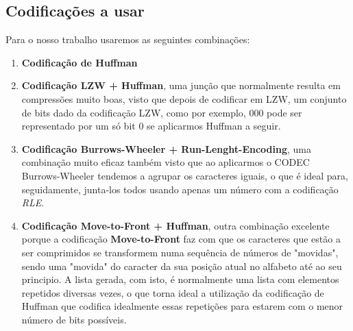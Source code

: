 \documentclass[11pt,journal,compsoc]{IEEEtran}
\begin{document}
\subsection{Codificações a usar}
Para o nosso trabalho usaremos as seguintes combinações:
\begin{enumerate}
    \item \textbf{Codificação de Huffman}
    \item \textbf{Codificação LZW + Huffman}, uma junção que normalmente resulta em compressões muito boas, visto que depois de codificar em LZW, um conjunto de bits dado da codificação LZW, como por exemplo, 000 pode ser representado por um só bit 0 se aplicarmos Huffman a seguir.
    \item \textbf{Codificação Burrows-Wheeler + Run-Lenght-Encoding}, uma combinação muito eficaz também visto que ao aplicarmos o CODEC Burrows-Wheeler tendemos a agrupar os caracteres iguais, o que é ideal para, seguidamente, junta-los todos usando apenas um número com a codificação \textit{RLE}.
    
    \item \textbf{Codificação Move-to-Front + Huffman}, outra combinação excelente porque a codificação \textbf{Move-to-Front} faz com que os caracteres que estão a ser comprimidos se transformem numa sequência de números de "movidas", sendo uma "movida" do caracter da sua posição atual no alfabeto até ao seu principio. A lista gerada, com isto, é normalmente uma lista com elementos repetidos diversas vezes, o que torna ideal a utilização da codificação de Huffman que codifica idealmente essas repetições para estarem com o menor número de bits possíveis.
\end{enumerate}

\end{document}
